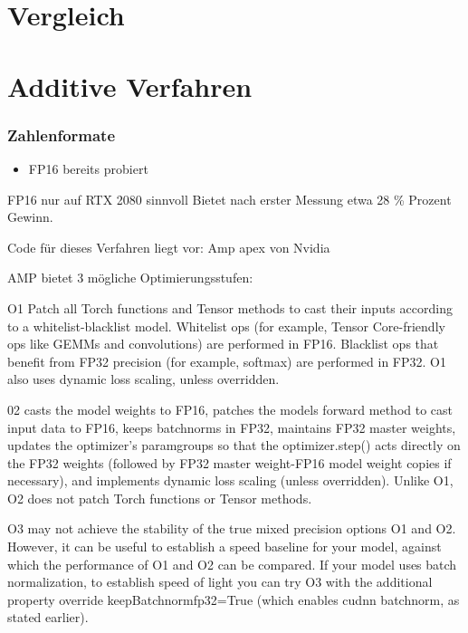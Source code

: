 
\chapter{Vergleich}\label{sec:vergleich}


\chapter{Additive Verfahren}

\subsection{Zahlenformate}\label{sec:zahlen}
\begin{itemize}
 \item FP16 bereits probiert
\end{itemize}


FP16 nur auf RTX 2080 sinnvoll
Bietet nach erster Messung etwa 28 \% Prozent Gewinn.

Code für dieses Verfahren liegt vor: Amp apex von Nvidia

AMP bietet 3 mögliche Optimierungsstufen:

O1
Patch all Torch functions and Tensor methods to cast their inputs according to a whitelist-blacklist model. Whitelist ops (for example, Tensor Core-friendly ops like GEMMs and convolutions) are performed in FP16. Blacklist ops that benefit from FP32 precision (for example, softmax) are performed in FP32. O1 also uses dynamic loss scaling, unless overridden.

02
casts the model weights to FP16, patches the models forward method to cast input data to FP16, keeps batchnorms in FP32, maintains FP32 master weights, updates the optimizer’s paramgroups so that the optimizer.step() acts directly on the FP32 weights (followed by FP32 master weight-FP16 model weight copies if necessary), and implements dynamic loss scaling (unless overridden). Unlike O1, O2 does not patch Torch functions or Tensor methods.


O3
may not achieve the stability of the true mixed precision options O1 and O2. However, it can be useful to establish a speed baseline for your model, against which the performance of O1 and O2 can be compared. If your model uses batch normalization, to establish speed of light you can try O3 with the additional property override keepBatchnormfp32=True (which enables cudnn batchnorm, as stated earlier).

